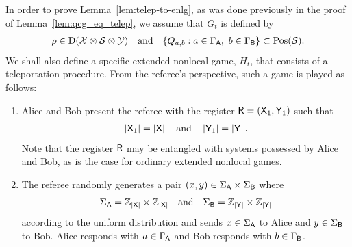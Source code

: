 In order to prove Lemma~\ref{lem:telep-to-enlg}, as was done previously in the proof of Lemma~\ref{lem:qcg_eq_telep}, we assume that $G_t$ is defined by 
\begin{align}
	\rho \in \mathrm{D}(\mathcal{X} \otimes \mathcal{S} \otimes \mathcal{Y}) \quad \textnormal{and} \quad \{Q_{a,b} : a \in \Gamma_{\mathsf{A}}, \ b \in \Gamma_{\mathsf{B}} \} \subset \mathrm{Pos}(\mathcal{S}).
\end{align} 
We shall also define a specific extended nonlocal game, $H_t$, that consists of a teleportation procedure. From the referee's perspective, such a game is played as follows:
\begin{enumerate}
	\item Alice and Bob present the referee with the register $\mathsf{R} = (\mathsf{X}_1, \mathsf{Y}_1)$ such that 
		\begin{align}
			\left\lvert \mathsf{X}_1 \right\rvert = \left\lvert \mathsf{X} \right\rvert \quad \textnormal{and} \quad \left\lvert \mathsf{Y}_1 \right\rvert = \left\lvert \mathsf{Y} \right\rvert.
		\end{align}
	Note that the register $\mathsf{R}$ may be entangled with systems possessed by Alice and Bob, as is the case for ordinary extended nonlocal games. 
	
	\item The referee randomly generates a pair $(x,y) \in \Sigma_{\mathsf{A}} \times \Sigma_{\mathsf{B}}$ where
	\begin{align}
		\Sigma_{\mathsf{A}} = \mathbb{Z}_{\left\lvert \mathsf{X} \right\rvert} \times \mathbb{Z}_{\left\lvert \mathsf{X} \right\rvert} \quad \textnormal{and} \quad \Sigma_{\mathsf{B}} = \mathbb{Z}_{\left\lvert \mathsf{Y} \right\rvert} \times \mathbb{Z}_{\left\lvert \mathsf{Y} \right\rvert}	
	\end{align}		
according to the uniform distribution and sends $x \in \Sigma_{\mathsf{A}}$ to Alice and $y \in \Sigma_{\mathsf{B}}$ to Bob. Alice responds with $a \in \Gamma_{\mathsf{A}}$ and Bob responds with $b \in \Gamma_{\mathsf{B}}$. 
	

\end{enumerate}
